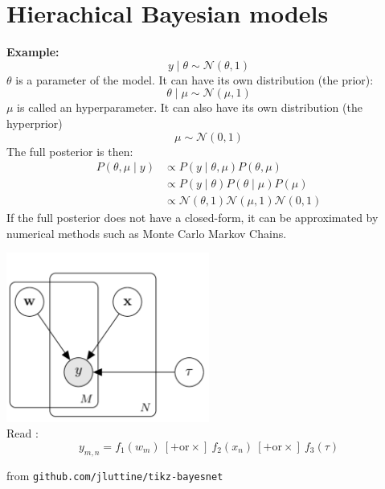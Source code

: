 \documentclass[10pt,xcolor=x11names,compress, show notes]{beamer}%
\newcommand{\N}{\mathcal{N}}
\begin{document}
\section{Hierachical Bayesian models}
\begin{frame}{\insertsectionhead}
\textbf{Example:}\\
$$y\mid \theta \sim \N(\theta, 1)$$
\pause
$\theta$ is a parameter of the model. It can have its own distribution (the prior):
$$\theta \mid \mu \sim \N(\mu,1)$$
\pause
$\mu$ is called an hyperparameter. It can also have its own distribution (the hyperprior)
$$\mu \sim \N(0,1)$$
\pause
The full posterior is then:
\begin{align*}
	P(\theta,\mu \mid y) &\propto P(y \mid \theta,\mu)P(\theta,\mu)\\
	& \propto P(y \mid \theta)P(\theta \mid \mu) P(\mu)\\
	&\propto \N(\theta, 1)\N(\mu,1) \N(0,1)
\end{align*}
\pause
If the full posterior does not have a closed-form, it can be approximated by numerical methods such as Monte Carlo Markov Chains. 
\end{frame}
\begin{frame}{\insertsectionhead}
\centering
\includegraphics[width=0.5\textwidth]{bayesnet1.png}\\
Read : 
\begin{equation*}
	     y_{m,n} = f_1(w_m) ~ [ + \text{or} \times ]~ f_2(x_n)~ [ + \text{or} \times ]~ f_3(\tau)
\end{equation*}


\vfill
\scriptsize from \texttt{github.com/jluttine/tikz-bayesnet}
\end{frame}
\end{document}
